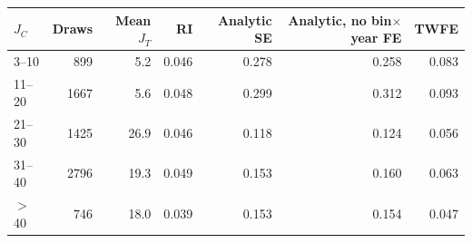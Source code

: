 \begin{tabular}{lrrrrrr}
\toprule
$J_C$ & Draws & Mean $J_T$ & RI & Analytic SE & Analytic, no bin$\times$year FE & TWFE \\
\midrule
3--10 & 899 & 5.2 & 0.046 & 0.278 & 0.258 & 0.083 \\
11--20 & 1667 & 5.6 & 0.048 & 0.299 & 0.312 & 0.093 \\
21--30 & 1425 & 26.9 & 0.046 & 0.118 & 0.124 & 0.056 \\
31--40 & 2796 & 19.3 & 0.049 & 0.153 & 0.160 & 0.063 \\
$>$40 & 746 & 18.0 & 0.039 & 0.153 & 0.154 & 0.047 \\
\bottomrule
\end{tabular}
